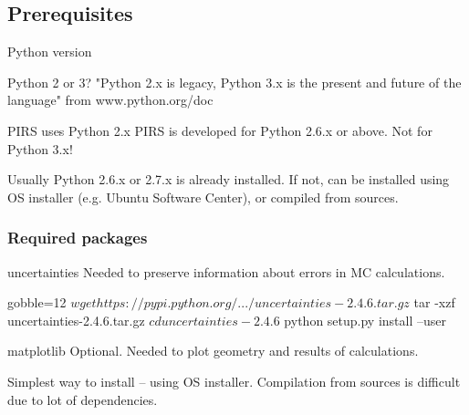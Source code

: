 \subsection{Prerequisites}

\begin{frame}{Python version}

    \begin{block}{Python 2 or 3?}
    "Python 2.x is legacy, Python 3.x is the present and future of the language" from www.python.org/doc 
    \end{block}

    \begin{block}{PIRS uses Python 2.x}
    PIRS is developed for Python 2.6.x or above. Not for Python 3.x!
    \end{block}
                
    Usually Python 2.6.x or 2.7.x is already installed. If not, can be
    installed using OS installer (e.g. Ubuntu Software Center), or compiled
    from sources.

\end{frame}

\begin{frame}[fragile]
    \frametitle{Required packages}
    \begin{block}{uncertainties} 
        Needed to preserve information about errors in MC calculations. 

        \begin{bashcode*}{gobble=12}
            $ wget https://pypi.python.org/.../uncertainties-2.4.6.tar.gz
            $ tar -xzf uncertainties-2.4.6.tar.gz
            $ cd uncertainties-2.4.6
            $ python setup.py install --user
        \end{bashcode*}
    \end{block}

    \begin{block}{matplotlib}
        Optional. Needed to plot geometry and results of calculations. 
        
        Simplest way to install -- using OS installer. Compilation from sources
        is difficult due to lot of dependencies.
    \end{block}

\end{frame}

